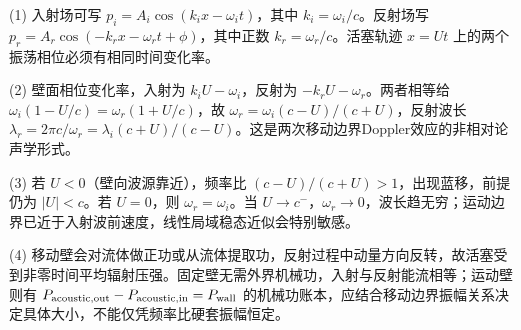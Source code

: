 (1) 入射场可写 \(p_i=A_i\cos(k_ix-\omega_it)\)，其中 \(k_i=\omega_i/c\)。反射场写 \(p_r=A_r\cos(-k_rx-\omega_rt+\phi)\)，其中正数 \(k_r=\omega_r/c\)。活塞轨迹 \(x=Ut\) 上的两个振荡相位必须有相同时间变化率。

(2) 壁面相位变化率，入射为 \(k_iU-\omega_i\)，反射为 \(-k_rU-\omega_r\)。两者相等给 \(\omega_i(1-U/c)=\omega_r(1+U/c)\)，故 \(\boxed{\omega_r=\omega_i(c-U)/(c+U)}\)，反射波长 \(\boxed{\lambda_r=2\pi c/\omega_r=\lambda_i(c+U)/(c-U)}\)。这是两次移动边界Doppler效应的非相对论声学形式。

(3) 若 \(U<0\)（壁向波源靠近），频率比 \((c-U)/(c+U)>1\)，出现蓝移，前提仍为 \(|U|<c\)。若 \(U=0\)，则 \(\omega_r=\omega_i\)。当 \(U\to c^-\)，\(\omega_r\to0\)，波长趋无穷；运动边界已近于入射波前速度，线性局域稳态近似会特别敏感。

(4) 移动壁会对流体做正功或从流体提取功，反射过程中动量方向反转，故活塞受到非零时间平均辐射压强。固定壁无需外界机械功，入射与反射能流相等；运动壁则有 \(P_{\rm acoustic,out}-P_{\rm acoustic,in}=P_{\rm wall}\) 的机械功账本，应结合移动边界振幅关系决定具体大小，不能仅凭频率比硬套振幅恒定。
